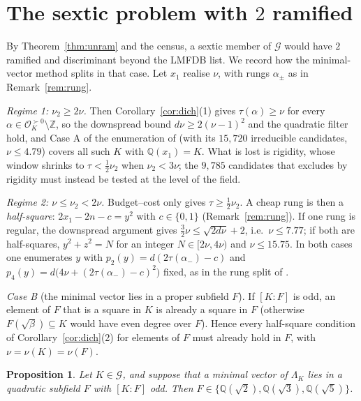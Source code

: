 \documentclass[11pt,reqno]{amsart}
\theoremstyle{plain}
\newtheorem{proposition}[theorem]{Proposition}
\theoremstyle{definition}
\newcommand{\Z}{\mathbb{Z}}
\newcommand{\Q}{\mathbb{Q}}
\newcommand{\OK}{\mathcal{O}_K}
\newcommand{\Gcl}{\mathcal{G}}
\newcommand{\tp}{\succ 0}
\begin{document}
\section{The sextic problem with $2$ ramified}\label{sec:ramified}

By Theorem~\ref{thm:unram} and the census, a sextic member of $\Gcl$ would have $2$ ramified and
discriminant beyond the LMFDB list. We record how the minimal-vector method splits in that case.
Let $x_1$ realise $\nu$, with rungs $\alpha_\pm$ as in Remark~\ref{rem:rung}.

\emph{Regime 1: $\nu_2\ge2\nu$.} Then Corollary~\ref{cor:dich}(1) gives $\tau(\alpha)\ge\nu$ for
every $\alpha\in\OK^{\tp}\setminus\Z$, so the downspread bound $d\nu\ge2(\nu-1)^{2}$ and the
quadratic filter hold, and Case A of the enumeration of \cite{TwoO} (with its $15{,}720$
irreducible candidates, $\nu\le4.79$) covers all such $K$ with $\Q(x_1)=K$. What is lost is
rigidity, whose window shrinks to $\tau<\frac12\nu_2$ when $\nu_2<3\nu$; the $9{,}785$ candidates
that \cite{TwoO} excludes by rigidity must instead be tested at the level of the field.

\emph{Regime 2: $\nu\le\nu_2<2\nu$.} Budget--cost only gives $\tau\ge\frac12\nu_2$. A cheap rung is
then a \emph{half-square}: $2x_1-2n-c=y^{2}$ with $c\in\{0,1\}$ (Remark~\ref{rem:rung}). If one rung
is regular, the downspread argument gives $\frac32\nu\le\sqrt{2d\nu}+2$, i.e.\ $\nu\le7.77$; if both
are half-squares, $y^{2}+z^{2}=N$ for an integer $N\in[2\nu,4\nu)$ and $\nu\le15.75$. In both cases
one enumerates $y$ with $p_2(y)=d(2\tau(\alpha_-)-c)$ and $p_4(y)=d\bigl(4\nu+(2\tau(\alpha_-)-c)^{2}\bigr)$
fixed, as in the rung split of \cite[degree-$8$ rung split]{TwoO}.

\emph{Case B} (the minimal vector lies in a proper subfield $F$). If $[K:F]$ is odd, an element of
$F$ that is a square in $K$ is already a square in $F$ (otherwise $F(\sqrt\beta)\subseteq K$ would
have even degree over $F$). Hence every half-square condition of Corollary~\ref{cor:dich}(2) for
elements of $F$ must already hold in $F$, with $\nu=\nu(K)=\nu(F)$.

\begin{proposition}\label{prop:quadB}
Let $K\in\Gcl$, and suppose that a minimal vector of $\Lambda_K$ lies in a quadratic subfield $F$
with $[K:F]$ odd. Then $F\in\{\Q(\sqrt2),\Q(\sqrt3),\Q(\sqrt5)\}$.
\end{proposition}
\end{document}
